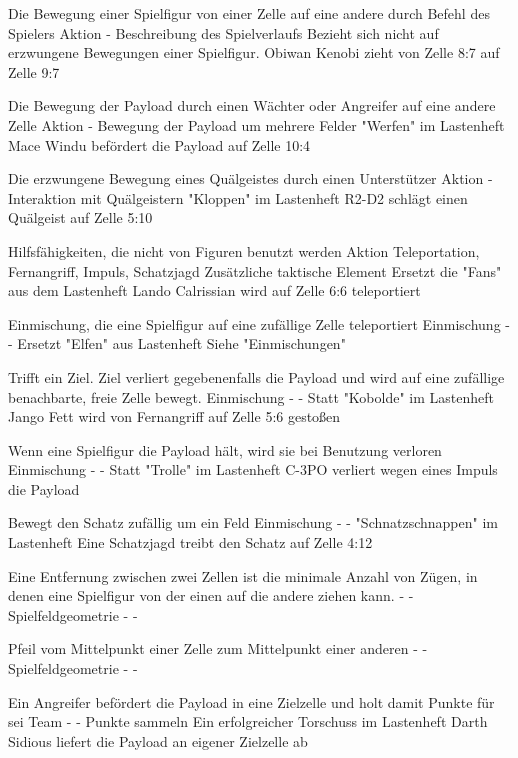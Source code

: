 {Die Bewegung einer Spielfigur von einer Zelle auf eine andere durch Befehl des Spielers}
{Aktion}
{-}
{Beschreibung des Spielverlaufs}
{Bezieht sich nicht auf erzwungene Bewegungen einer Spielfigur.}
{Obiwan Kenobi zieht von Zelle 8:7 auf Zelle 9:7}

{Die Bewegung der Payload durch einen Wächter oder Angreifer auf eine andere Zelle}
{Aktion}
{-}
{Bewegung der Payload um mehrere Felder}
{"Werfen" im Lastenheft}
{Mace Windu befördert die Payload auf Zelle 10:4}

{Die erzwungene Bewegung eines Quälgeistes durch einen Unterstützer}
{Aktion}
{-}
{Interaktion mit Quälgeistern}
{"Kloppen" im Lastenheft}
{R2-D2 schlägt einen Quälgeist auf Zelle 5:10}

{Hilfsfähigkeiten, die nicht von Figuren benutzt werden}
{Aktion}
{Teleportation, Fernangriff, Impuls, Schatzjagd}
{Zusätzliche taktische Element}
{Ersetzt die "Fans" aus dem Lastenheft}
{Lando Calrissian wird auf Zelle 6:6 teleportiert}

{Einmischung, die eine Spielfigur auf eine zufällige Zelle teleportiert}
{Einmischung}
{-}
{-}
{Ersetzt "Elfen" aus Lastenheft}
{Siehe "Einmischungen"}

{Trifft ein Ziel. Ziel verliert gegebenenfalls die Payload und wird auf eine zufällige benachbarte, freie Zelle bewegt.}
{Einmischung}
{-}
{-}
{Statt "Kobolde" im Lastenheft}
{Jango Fett wird von Fernangriff auf Zelle 5:6 gestoßen}

{Wenn eine Spielfigur die Payload hält, wird sie bei Benutzung verloren}
{Einmischung}
{-}
{-}
{Statt "Trolle" im Lastenheft}
{C-3PO verliert wegen eines Impuls die Payload}

{Bewegt den Schatz zufällig um ein Feld}
{Einmischung}
{-}
{-}
{"Schnatzschnappen" im Lastenheft}
{Eine Schatzjagd treibt den Schatz auf Zelle 4:12}

{Eine Entfernung zwischen zwei Zellen ist die minimale Anzahl von Zügen, in denen eine Spielfigur von der einen auf die andere ziehen kann.}
{-}
{-}
{Spielfeldgeometrie}
{-}
{-}

{Pfeil vom Mittelpunkt einer Zelle zum Mittelpunkt einer anderen}
{-}
{-}
{Spielfeldgeometrie}
{-}
{-}

{Ein Angreifer befördert die Payload in eine Zielzelle und holt damit Punkte für sei Team}
{-}
{-}
{Punkte sammeln}
{Ein erfolgreicher Torschuss im Lastenheft}
{Darth Sidious liefert die Payload an eigener Zielzelle ab}

